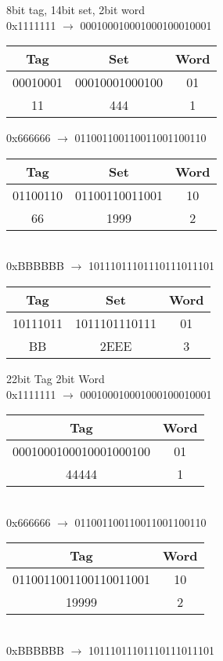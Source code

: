 \documentclass[12pt,largemargins]{homework}
\begin{document}
\begin{alphaparts}
\item
8bit tag, 14bit set, 2bit word\\
0x1111111 $\rightarrow$ 000100010001000100010001\\
\begin{tabular}{|c|c|c|}
\hline
Tag & Set & Word \\
\hline
00010001 & 00010001000100 & 01 \\
\hline
11&444&1\\
\hline
\end{tabular}

0x666666 $\rightarrow$ 011001100110011001100110\\
\begin{tabular}{|c|c|c|}
\hline
Tag & Set & Word \\
\hline
01100110&01100110011001&10\\
\hline
66&1999&2\\
\hline
\end{tabular}\\
0xBBBBBB $\rightarrow$ 10111011101110111011101\\
\begin{tabular}{|c|c|c|}
\hline
Tag & Set & Word \\
\hline
10111011&1011101110111&01\\
\hline
BB&2EEE&3\\
\hline
\end{tabular}
\item
22bit Tag 2bit Word\\
0x1111111 $\rightarrow$ 000100010001000100010001\\
\begin{tabular}{|c|c|}
\hline
Tag&Word\\
\hline
0001000100010001000100&01\\
\hline
44444&1\\
\hline
\end{tabular}\\
0x666666 $\rightarrow$ 011001100110011001100110\\
\begin{tabular}{|c|c|}
\hline
Tag&Word\\
\hline
0110011001100110011001&10\\
\hline
19999&2\\
\hline
\end{tabular}\\
\newpage
0xBBBBBB $\rightarrow$ 10111011101110111011101\\

\end{alphaparts}
\end{document}
